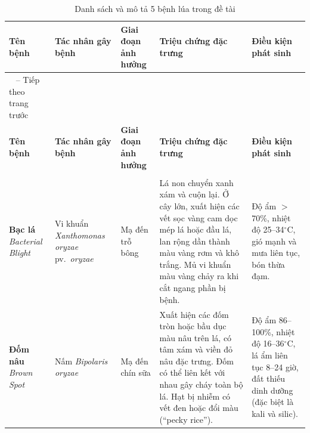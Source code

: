 \documentclass[12pt,a4paper]{article}
\begin{document}
\begin{longtable}{|
    >{\raggedright\arraybackslash}p{2.5cm}|
    >{\raggedright\arraybackslash}p{3cm}|
    >{\raggedright\arraybackslash}p{2cm}|
    >{\raggedright\arraybackslash}p{4cm}|
    >{\raggedright\arraybackslash}p{3cm}|}
    
\caption{Danh sách và mô tả 5 bệnh lúa trong đề tài}
\label{tab:diseases} \\
\hline
\rowcolor{headerblue}
\textbf{Tên bệnh} & \textbf{Tác nhân gây bệnh} & \textbf{Giai đoạn ảnh hưởng} & \textbf{Triệu chứng đặc trưng} & \textbf{Điều kiện phát sinh} \\ \hline
\endfirsthead

\multicolumn{5}{c}%
{{\tablename\ \thetable{} -- Tiếp theo trang trước}} \\
\hline
\rowcolor{headerblue}
\textbf{Tên bệnh} & \textbf{Tác nhân gây bệnh} & \textbf{Giai đoạn ảnh hưởng} & \textbf{Triệu chứng đặc trưng} & \textbf{Điều kiện phát sinh} \\ \hline
\endhead

\hline \multicolumn{5}{|r|}{{Tiếp tục ở trang sau...}} \\ \hline
\endfoot

\hline
\endlastfoot


\textbf{Bạc lá} \newline \textit{Bacterial Blight} & 
Vi khuẩn \textit{Xanthomonas oryzae} pv.\ \textit{oryzae} & 
Mạ đến trỗ bông & 
Lá non chuyển xanh xám và cuộn lại. Ở cây lớn, xuất hiện các vết sọc vàng cam dọc mép lá hoặc đầu lá, lan rộng dần thành màu vàng rơm và khô trắng. Mủ vi khuẩn màu vàng chảy ra khi cắt ngang phần bị bệnh. & 
Độ ẩm $>$ 70\%, nhiệt độ 25--34$^\circ$C, gió mạnh và mưa liên tục, bón thừa đạm. \\ \hline 

\textbf{Đốm nâu} \newline \textit{Brown Spot} & 
Nấm \textit{Bipolaris oryzae} & 
Mạ đến chín sữa & 
Xuất hiện các đốm tròn hoặc bầu dục màu nâu trên lá, có tâm xám và viền đỏ nâu đặc trưng. Đốm có thể liên kết với nhau gây cháy toàn bộ lá. Hạt bị nhiễm có vết đen hoặc đổi màu (``pecky rice''). & 
Độ ẩm 86--100\%, nhiệt độ 16--36$^\circ$C, lá ẩm liên tục 8--24 giờ, đất thiếu dinh dưỡng (đặc biệt là kali và silic). \\ \hline 


\end{longtable}
\end{document}
